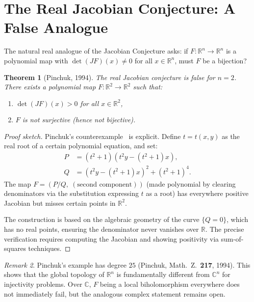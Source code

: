 \documentclass[12pt,a4paper]{amsart}
\newtheorem{theorem}{Theorem}[section]
\theoremstyle{definition}
\theoremstyle{remark}
\newtheorem{remark}[theorem]{Remark}
\begin{document}
\section{The Real Jacobian Conjecture: A False Analogue}
\label{sec:real}

The natural real analogue of the Jacobian Conjecture asks: if
$F \colon \mathbb{R}^n \to \mathbb{R}^n$ is a polynomial map with $\det(JF)(x) \neq 0$
for all $x \in \mathbb{R}^n$, must $F$ be a bijection?

\begin{theorem}[Pinchuk, 1994]\label{thm:pinchuk}
The real Jacobian conjecture is \emph{false} for $n = 2$. There exists a polynomial
map $F \colon \mathbb{R}^2 \to \mathbb{R}^2$ such that:
\begin{enumerate}[label=(\roman*)]
  \item $\det(JF)(x) > 0$ for all $x \in \mathbb{R}^2$,
  \item $F$ is not surjective (hence not bijective).
\end{enumerate}
\end{theorem}

\begin{proof}[Proof sketch]
Pinchuk's counterexample~\cite{Pin94} is explicit. Define $t = t(x,y)$ as the
real root of a certain polynomial equation, and set:
\begin{align*}
  P &= (t^2 + 1)(t^2 y - (t^2+1)x),\\
  Q &= (t^2 y - (t^2+1)x)^2 + (t^2+1)^4.
\end{align*}
The map $F = (P/Q,\; (\text{second component}))$ (made polynomial by clearing
denominators via the substitution expressing $t$ as a root) has everywhere positive
Jacobian but misses certain points in $\mathbb{R}^2$.

The construction is based on the algebraic geometry of the curve $\{Q = 0\}$,
which has no real points, ensuring the denominator never vanishes over $\mathbb{R}$.
The precise verification requires computing the Jacobian and showing positivity
via sum-of-squares techniques.
\end{proof}

\begin{remark}
Pinchuk's example has degree $25$ (Pinchuk, Math.~Z.\ \textbf{217}, 1994).
This shows that the global topology of $\mathbb{R}^n$ is
fundamentally different from $\mathbb{C}^n$ for injectivity problems.
Over $\mathbb{C}$, $F$ being a local biholomorphism everywhere does not
immediately fail, but the analogous complex statement remains open.
\end{remark}
\end{document}
